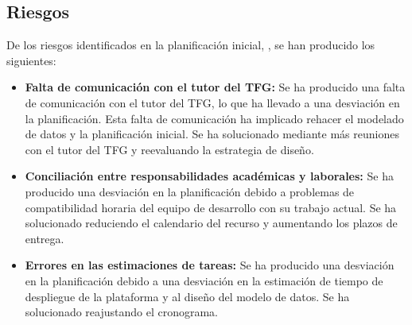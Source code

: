 \subsection{Riesgos}
De los riesgos identificados en la planificación inicial, , se han producido los siguientes:
\begin{itemize}
    \item \textbf{Falta de comunicación con el tutor del TFG:} Se ha producido una falta de comunicación con el tutor del TFG, lo que ha llevado a una desviación en la planificación. 
    Esta falta de comunicación ha implicado rehacer el modelado de datos y la planificación inicial.
    Se ha solucionado mediante más reuniones con el tutor del TFG y reevaluando la estrategia de diseño.
    \item \textbf{Conciliación entre responsabilidades académicas y laborales:} Se ha producido una desviación en la planificación debido a problemas de compatibilidad horaria del equipo de desarrollo con su trabajo actual.
    Se ha solucionado reduciendo el calendario del recurso y aumentando los plazos de entrega.
    \item \textbf{Errores en las estimaciones de tareas:} Se ha producido una desviación en la planificación debido a una desviación en la estimación de tiempo de despliegue de la plataforma y al diseño del modelo de datos.
    Se ha solucionado reajustando el cronograma.

\end{itemize}
